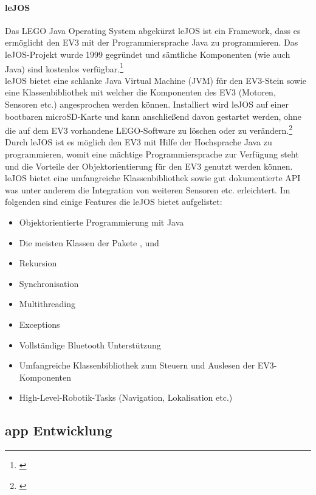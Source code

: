 \paragraph{leJOS}
Das LEGO Java Operating System abgekürzt leJOS ist ein Framework, dass es ermöglicht den EV3 mit der Programmiersprache Java zu programmieren. Das leJOS-Projekt wurde 1999 gegründet und sämtliche Komponenten (wie auch Java) sind kostenlos verfügbar.\footnote{\citep[vgl.][EV3-Programmieren mit Java, Seite 21]{Schobel.RobertaEV3Programmieren}\label{note34}} \\
leJOS bietet eine schlanke Java Virtual Machine (JVM) für den EV3-Stein sowie eine Klassenbibliothek mit welcher die Komponenten des EV3 (Motoren, Sensoren etc.) angesprochen werden können. Installiert wird leJOS auf einer bootbaren microSD-Karte und kann anschließend davon gestartet werden, ohne die auf dem EV3 vorhandene LEGO-Software zu löschen oder zu verändern.\footnote{\citep[vgl.][EV3-Programmieren mit Java, Seite 23]{Schobel.RobertaEV3Programmieren}\label{note35}} \\
Durch leJOS ist es möglich den EV3 mit Hilfe der Hochsprache Java zu programmieren, womit eine mächtige Programmiersprache zur Verfügung steht und die Vorteile der Objektorientierung für den EV3 genutzt werden können.
leJOS bietet eine umfangreiche Klassenbibliothek sowie gut dokumentierte API was unter anderem die Integration von weiteren Sensoren etc. erleichtert.
Im folgenden sind einige Features die leJOS bietet aufgelistet:
\begin{itemize}
	\item{Objektorientierte Programmierung mit Java}
	\item{Die meisten Klassen der Pakete ,  und }
	\item{Rekursion}
	\item{Synchronisation}
	\item{Multithreading}
	\item{Exceptions}
	\item{Vollständige Bluetooth Unterstützung}
	\item{Umfangreiche Klassenbibliothek zum Steuern und Auslesen der EV3-Komponenten}
	\item{High-Level-Robotik-Tasks (Navigation, Lokalisation etc.)}
\end{itemize}

\newpage
\color{finishing}
\subsection{\gls{app} Entwicklung} %

